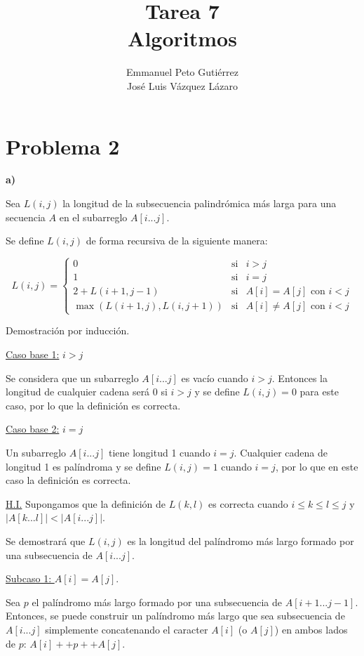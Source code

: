 \documentclass{article}
\title{Tarea 7\\Algoritmos}
\author{Emmanuel Peto Gutiérrez\\José Luis Vázquez Lázaro}
\begin{document}
\maketitle

\section*{Problema 2}

\textbf{a)}

Sea $L(i,j)$ la longitud de la subsecuencia palindrómica más larga para una secuencia $A$ en el subarreglo $A[i...j]$.

Se define $L(i,j)$ de forma recursiva de la siguiente manera:

\[
L(i, j) = \left\{ \begin{array}{lcc}
             0 & \text{si} & i>j \\
             1 &  \text{si} & i=j \\
             2+L(i+1,j-1) & \text{si} & A[i]=A[j] \text{ con } i<j\\
             \max(L(i+1, j), L(i, j+1)) & \text{si} & A[i] \neq A[j] \text{ con } i<j
             \end{array}
   \right.
\]

Demostración por inducción.

\underline{Caso base 1:} $i>j$

Se considera que un subarreglo $A[i...j]$ es vacío cuando $i>j$. Entonces la longitud de cualquier cadena será 0 si $i>j$ y se define $L(i, j)=0$ para este caso, por lo que la definición es correcta.

\underline{Caso base 2:} $i=j$

Un subarreglo $A[i...j]$ tiene longitud 1 cuando $i=j$. Cualquier cadena de longitud 1 es palíndroma y se define $L(i,j)=1$ cuando $i=j$, por lo que en este caso la definición es correcta.

\underline{H.I.} Supongamos que la definición de $L(k,l)$ es correcta cuando $i \leq k \leq l \leq j$ y $|A[k...l]| < |A[i...j]|$.

Se demostrará que $L(i, j)$ es la longitud del palíndromo más largo formado por una subsecuencia de $A[i...j]$.

\underline{Subcaso 1: $A[i]=A[j]$}.

Sea $p$ el palíndromo más largo formado por una subsecuencia de $A[i+1...j-1]$. Entonces, se puede construir un palíndromo más largo que sea subsecuencia de $A[i...j]$ simplemente concatenando el caracter $A[i]$ (o $A[j]$) en ambos lados de $p$: $A[i]++p++A[j]$.
\end{document}
